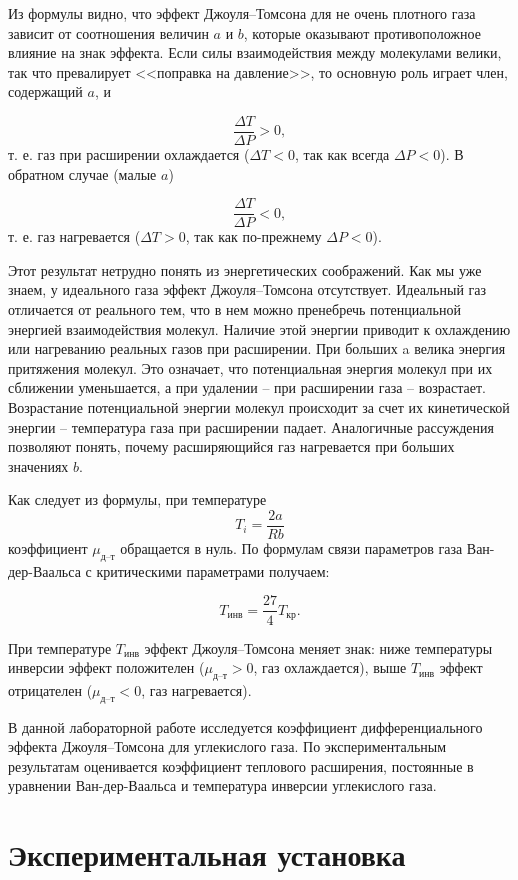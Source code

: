 \documentclass[a4paper,12pt]{article}
\begin{document}
    Из формулы видно, что эффект Джоуля–Томсона для не очень плотного газа зависит от соотношения величин $ a $ и $ b $, которые оказывают противоположное влияние на знак эффекта. Если силы взаимодействия между молекулами велики, так что превалирует <<поправка на давление>>, то основную роль играет член, содержащий $ a $, и 

\[ \frac{\Delta T}{\Delta P} > 0, \]
т. е. газ при расширении охлаждается ($ \Delta T < 0 $, так как всегда $ \Delta P < 0 $). В обратном случае (малые $ a $)

\[ \frac{\Delta T}{\Delta P} < 0, \]
т. е. газ нагревается ($ \Delta T > 0 $, так как по-прежнему $ \Delta P < 0 $).

Этот результат нетрудно понять из энергетических соображений. Как мы уже знаем, у идеального газа эффект Джоуля–Томсона отсутствует. Идеальный газ отличается от реального тем, что в нем можно пренебречь потенциальной энергией взаимодействия молекул. Наличие этой энергии приводит к охлаждению или нагреванию реальных газов при расширении. При больших a велика энергия притяжения молекул. Это означает, что потенциальная энергия молекул при их сближении уменьшается, а при удалении -- при расширении газа -- возрастает. Возрастание потенциальной энергии молекул происходит за счет их кинетической энергии -- температура газа при расширении падает. Аналогичные рассуждения позволяют понять, почему расширяющийся газ нагревается при больших значениях $ b $.

Как следует из формулы, при температуре \[ T_i = \frac{2a}{Rb} \] коэффициент $ \mu_\text{д--т} $ обращается в нуль. По формулам связи параметров газа Ван-дер-Ваальса с критическими параметрами получаем: 

\begin{equation}
T_\text{инв} = \frac{27}{4} T_\text{кр}.
\end{equation}

При температуре $ T_\text{инв} $ эффект Джоуля–Томсона меняет знак: ниже температуры инверсии эффект положителен ($ \mu_\text{д--т} > 0 $, газ охлаждается), выше $ T_\text{инв} $ эффект отрицателен ($ \mu_\text{д--т} < 0 $, газ нагревается).

В данной лабораторной работе исследуется коэффициент дифференциального эффекта Джоуля–Томсона для углекислого газа. По экспериментальным результатам оценивается коэффициент теплового расширения, постоянные в уравнении Ван-дер-Ваальса и температура инверсии углекислого газа.

\section{Экспериментальная установка}
\end{document}
